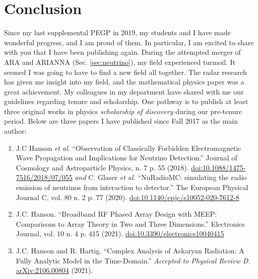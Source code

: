 \documentclass[../../main.tex]{subfiles}
\begin{document}
%

\begin{flushleft}

\end{flushleft}

\section{Conclusion}

Since my last supplemental PEGP in 2019, my students and I have made wonderful progress, and I am proud of them.  In particular, I am excited to share with you that I have been publishing again.  During the attempted merger of ARA and ARIANNA (Sec. \ref{sec:neutrino}), my field experienced turmoil.  It seemed I was going to have to find a new field all together.  The radar research has given me insight into my field, and the mathematical physics paper was a great achievement.  My colleagues in my department have shared with me our guidelines regarding tenure and scholarship.  One pathway is to publish at least three original works in physics \textit{scholarship of discovery} during our pre-tenure period.  Below are three papers I have published since Fall 2017 as the main author:
\begin{enumerate}
\item J.C Hanson \textit{et al}.  ``Observation of Classically Forbidden Electromagnetic Wave Propagation and Implications for Neutrino Detection.''  Journal of Cosmology and Astroparticle Physics, n. 7 p. 55 (2018). \url{doi:10.1088/1475-7516/2018/07/055} \textit{and} C. Glaser \textit{et al.} ``NuRadioMC: simulating the radio emission of neutrinos from interaction to detector.'' The European Physical Journal C, vol. 80 n. 2 p. 77 (2020).  \url{doi:10.1140/epjc/s10052-020-7612-8}
\item J.C. Hanson.  ``Broadband RF Phased Array Design with MEEP: Comparisons to Array Theory in Two and Three Dimensions.''  Electronics Journal, vol. 10 n. 4 p. 415 (2021).  \url{doi:10.3390/electronics10040415}
\item J.C. Hanson and R. Hartig. ``Complex Analysis of Askaryan Radiation: A Fully Analytic Model in the Time-Domain.'' \textit{Accepted to Physical Review D.} \url{arXiv:2106.00804} (2021).
\end{enumerate}
\end{document}

